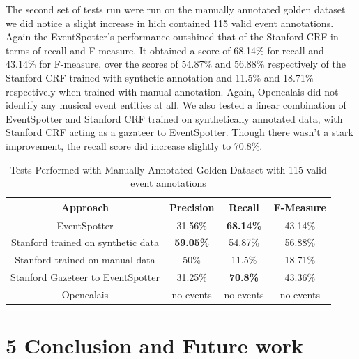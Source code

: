 \documentclass[a4paper,11pt]{report}
\begin{document}
The second set of tests run were run on the manually annotated golden dataset we did notice a slight increase in hich contained 115 valid event annotations. Again the EventSpotter's performance outshined that of the Stanford CRF in terms of recall and F-measure. It obtained a score of 68.14\% for recall and 43.14\% for F-measure, over the scores of 54.87\% and 56.88\% respectively of the Stanford CRF trained with synthetic annotation and 11.5\% and 18.71\% respectively when trained with manual annotation. Again, Opencalais did not identify any musical event entities at all. We also tested a linear combination of EventSpotter and Stanford CRF trained on synthetically annotated data, with Stanford CRF acting as a gazateer to EventSpotter. Though there wasn't a stark improvement, the recall score did increase slightly to 70.8\%.
\begin{table}
\caption{Tests Performed with Manually Annotated Golden Dataset with 115 valid event annotations} %
\centering %
\begin{tabular}{c c c c} %
\hline\hline %
Approach & Precision & Recall & F-Measure \\ [0.5ex] %
\hline %
EventSpotter & 31.56\% & \bf 68.14\% \bf & 43.14\% \\
Stanford trained on synthetic data & \bf 59.05\% \bf & 54.87\% & 56.88\%\\
Stanford trained on manual data & 50\% & 11.5\% & 18.71\% \\
Stanford Gazeteer to EventSpotter & 31.25\% & \bf 70.8\% \bf & 43.36\% \\
Opencalais & no events & no events & no events \\
\hline %
\end{tabular}
\label{table:nonlin} %
\end{table}

\chapter*{5 Conclusion and Future work}
\end{document}
